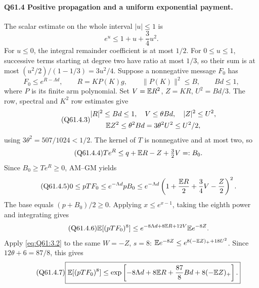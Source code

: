 \paragraph{Q61.4 Positive propagation and a uniform exponential payment.}
The scalar estimate on the whole interval \(|u|\le\allowbreak 1\) is
\begin{equation}\tag{Q61.4.1}\label{eq:Q61:4.1}
e^u\le1+u+\frac34u^2.
\end{equation}
For \(u\le\allowbreak 0\), the integral remainder coefficient is at most \(1/2\).
For \(0\le\allowbreak  u\le\allowbreak 1\), successive terms starting at degree two have
ratio at most \(1/3\), so their sum is at most
\((u^2/2)/(1-1/3)=\allowbreak 3u^2/4\).
Suppose a nonnegative message \(F_0\) has
\begin{equation}\tag{Q61.4.2}\label{eq:Q61:4.2}
F_0\le e^{R-\Lambda d},\qquad R=KP(K)g,\qquad
\|P(K)\|^2\le B,\qquad Bd\le1,
\end{equation}
where \(P\) is its finite arm polynomial. Set
\(V=\allowbreak \mathbb E R^2\), \(Z=\allowbreak KR\), \(U^2=\allowbreak Bd/3\).
The row, spectral and \(K^2\) row estimates give
\begin{equation}\tag{Q61.4.3}\label{eq:Q61:4.3}
\begin{gathered}
|R|^2\le Bd\le1,\quad V\le\theta Bd,\quad |Z|^2\le U^2,\\
\mathbb E Z^2\le\theta^2Bd=3\theta^2U^2\le U^2/2,
\end{gathered}
\end{equation}
using \(3\theta^2=\allowbreak 507/1024<\allowbreak 1/2\).
The kernel of \(T\) is nonnegative and at most two, so
\begin{equation}\tag{Q61.4.4}\label{eq:Q61:4.4}
Te^R\le q+\mathbb E R-Z+\tfrac32V=:B_0.
\end{equation}
Since \(B_0\ge\allowbreak  Te^R\ge\allowbreak 0\), AM--GM yields
\begin{equation}\tag{Q61.4.5}\label{eq:Q61:4.5}
0\le pTF_0\le e^{-\Lambda d}pB_0
\le e^{-\Lambda d}\left(1+\frac{\mathbb E R}{2}+\frac34V-\frac Z2\right)^2.
\end{equation}
The base equals \((p+B_0)/2\ge\allowbreak 0\). Applying \(x\le\allowbreak  e^{x-1}\),
taking the eighth power and integrating gives
\begin{equation}\tag{Q61.4.6}\label{eq:Q61:4.6}
\mathbb E[(pTF_0)^8]\le e^{-8\Lambda d+8\mathbb E R+12V}\mathbb E e^{-8Z}.
\end{equation}
Apply \eqref{eq:Q61:3.2} to the same \(W=\allowbreak -Z\), \(s=\allowbreak 8\):
\(\mathbb E e^{-8Z}\le\allowbreak  e^{8(-\mathbb E Z)_++18U^2}\).
Since \(12\theta+6=\allowbreak 87/8\), this gives
\begin{equation}\tag{Q61.4.7}\label{eq:Q61:4.7}
\boxed{\mathbb E[(pTF_0)^8]\le
\exp\left[-8\Lambda d+8\mathbb E R+\frac{87}{8}Bd+8(-\mathbb E Z)_+\right].}
\end{equation}

